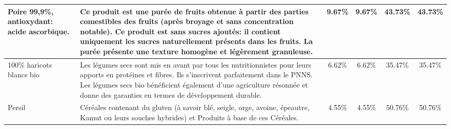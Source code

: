 \begin{tabular}{p{5cm}p{5cm}cccc}
                                                                                                                                                                                                                                              Poire 99,9\%, antioxydant: acide ascorbique. &                                    Ce produit est une purée de fruits obtenue à partir des parties comestibles des fruits (après broyage et sans  \newline concentration notable). \newline Ce produit est sans sucres ajoutés: il contient uniquement les sucres naturellement présents dans les fruits. \newline La purée présente une texture homogène et légèrement granuleuse. &   9.67\% &   9.67\% &  43.73\% &   43.73\% \\ \hline
                                                                                                                                                                                                                                                                 100\% haricots blancs bio &                                                                Les légumes secs sont mis en avant par tous les nutritionnistes pour leurs apports en protéines et fibres. Ils s’inscrivent parfaitement  \newline dans le PNNS.  \newline Les légumes secs bio bénéficient également d’une agriculture résonnée et donne des garanties en termes de développement durable.  &   6.62\% &   6.62\% &  35.47\% &   35.47\% \\ \hline
                                                                                                                                                                                                                                                                                   Persil &                                                                                                                                                                                                           Céréales contenant du gluten (à savoir blé, seigle, orge, avoine, épeautre, Kamut ou leurs souches hybrides) \newline et Produits à base de ces Céréales. &   4.55\% &   4.55\% &  50.76\% &   50.76\% \\ \hline
\bottomrule
\end{tabular}
